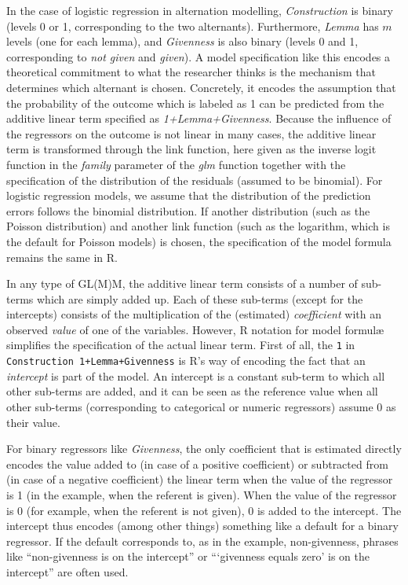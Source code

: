 In the case of logistic regression in alternation modelling, \textit{Construction} is binary (levels 0 or 1, corresponding to the two alternants).
Furthermore, \textit{Lemma} has $m$ levels (one for each lemma), and \textit{Givenness} is also binary (levels 0 and 1, corresponding to \textit{not given} and \textit{given}).
A model specification like this encodes a theoretical commitment to what the researcher thinks is the mechanism that determines which alternant is chosen.
Concretely, it encodes the assumption that the probability of the outcome which is labeled as 1 can be predicted from the additive linear term specified as \textit{1+Lemma+Givenness}.
Because the influence of the regressors on the outcome is not linear in many cases, the additive linear term is transformed through the link function, here given as the inverse logit function in the \textit{family} parameter of the \textit{glm} function together with the specification of the distribution of the residuals (assumed to be binomial).
For logistic regression models, we assume that the distribution of the prediction errors follows the binomial distribution.
If another distribution (such as the Poisson distribution) and another link function (such as the logarithm, which is the default for Poisson models) is chosen, the specification of the model formula remains the same in R.

In any type of GL(M)M, the additive linear term consists of a number of sub-terms which are simply added up.
Each of these sub-terms (except for the intercepts) consists of the multiplication of the (estimated) \textit{coefficient} with an observed \textit{value} of one of the variables.
However, R notation for model formulæ simplifies the specification of the actual linear term.
First of all, the \texttt{1} in \texttt{Construction~1+Lemma+Givenness} is R's way of encoding the fact that an \textit{intercept} is part of the model.
An intercept is a constant sub-term to which all other sub-terms are added, and it can be seen as the reference value when all other sub-terms (corresponding to categorical or numeric regressors) assume 0 as their value.

For binary regressors like \textit{Givenness}, the only coefficient that is estimated directly encodes the value added to (in case of a positive coefficient) or subtracted from (in case of a negative coefficient) the linear term when the value of the regressor is 1 (in the example, when the referent is given).
When the value of the regressor is 0 (for example, when the referent is not given), 0 is added to the intercept.
The intercept thus encodes (among other things) something like a default for a binary regressor.
If the default corresponds to, as in the example, non-givenness, phrases like ``non-givenness is on the intercept'' or ```givenness equals zero' is on the intercept'' are often used.

